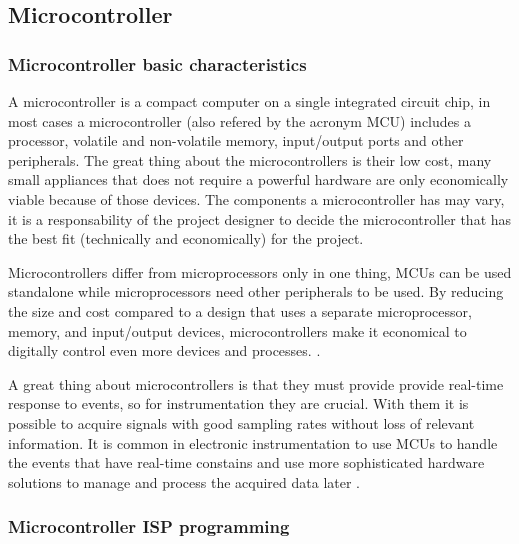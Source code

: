 \subsection{Microcontroller}\label{ssec:mcu-review}

\subsubsection{Microcontroller basic characteristics}\label{sssec:microcontroller-basic-characteristics}

A microcontroller is a compact computer on a single integrated circuit chip, in most cases a microcontroller (also refered by the acronym MCU) includes a processor, volatile and non-volatile memory, input/output ports and other peripherals. The great thing about the microcontrollers is their low cost, many small appliances that does not require a powerful hardware are only economically viable because of those devices. The components a microcontroller has may vary, it is a responsability of the project designer to decide the microcontroller that has the best fit (technically and economically) for the project.
	\par
	Microcontrollers differ from microprocessors only in one thing, MCUs can be used standalone while microprocessors need other peripherals to be used. By reducing the size and cost compared to a design that uses a separate microprocessor, memory, and input/output devices, microcontrollers make it economical to digitally control even more devices and processes. \cite{mcuDef}.
	\par
	A great thing about microcontrollers is that they must provide provide real-time response to events, so for instrumentation they are crucial. With them it is possible to acquire signals with good sampling rates without loss of relevant information. It is common in electronic instrumentation to use MCUs to handle the events that have real-time constains and use more sophisticated hardware solutions to manage and process the acquired data later \cite{bartz2004data}.

\subsubsection{Microcontroller ISP programming}\label{sssec:microcontroller-isp-programming}